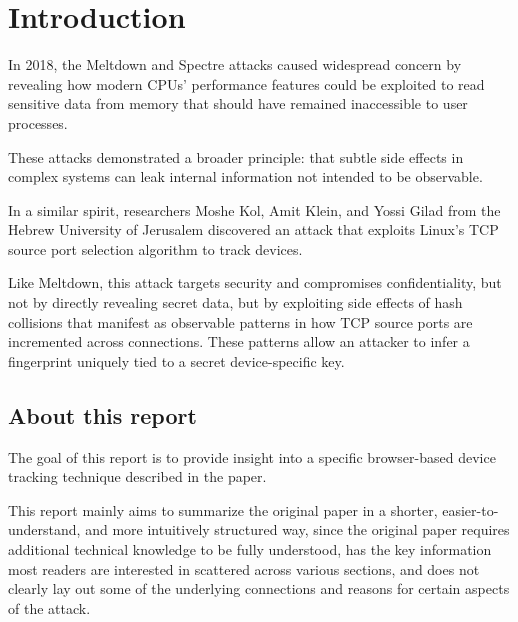 \documentclass[twocolumn]{report}
\begin{document}
\fontsize{7pt}{8pt}\selectfont
{}



\clearpage
{}
\tableofcontents
\clearpage
\clearpage

\pagestyle{plain}
\clearpage

\section{Introduction}
\label{sec:introduction}

In 2018, the \alert{Meltdown} and \alert{Spectre} attacks caused widespread concern by revealing how modern CPUs’ performance features could be exploited to read sensitive data from memory that should have remained inaccessible to user processes.

These attacks demonstrated a broader principle: that subtle side effects in complex systems can leak internal information not intended to be observable.

In a similar spirit, researchers Moshe Kol, Amit Klein, and Yossi Gilad from the Hebrew University of Jerusalem discovered an attack that exploits Linux’s \alert{TCP source port selection algorithm} to track devices.

Like Meltdown, this attack targets \alert{security} and compromises confidentiality, but not by directly revealing secret data, but by exploiting side effects of \alert{hash collisions} that manifest as observable patterns in how \alert{TCP source ports} are incremented across connections. These patterns allow an attacker to infer a fingerprint uniquely tied to a \alert{secret device-specific key}.

\subsection{About this report}
\label{sec:goal_of_this_report}

The goal of this report is to provide insight into a specific browser-based device tracking technique described in the paper\cite{kol2022devicetrackinglinuxsnew}.

This report mainly aims to \alert{summarize} the original paper in a \alert{shorter}, \alert{easier-to-understand}, and \alert{more intuitively structured way}, since the original paper requires additional technical knowledge to be fully understood, has the key information most readers are interested in scattered across various sections, and does not clearly lay out some of the underlying connections and reasons for certain aspects of the attack.
\end{document}
